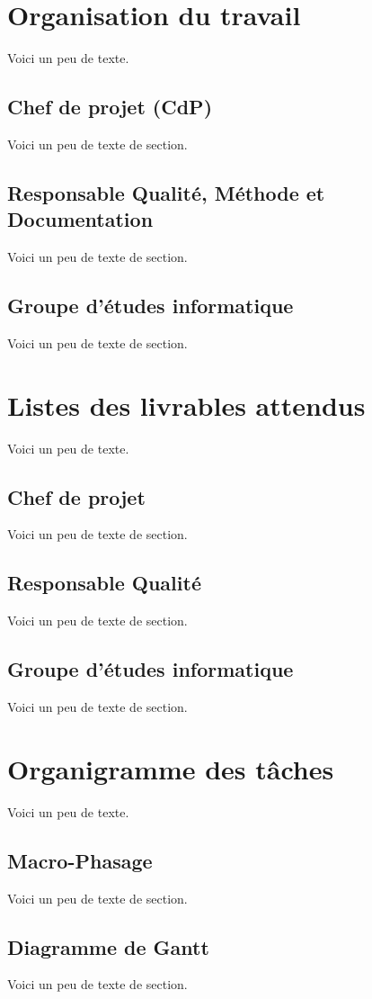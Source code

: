     \chapter{Organisation du travail}
    Voici un peu de texte.
    \section{Chef de projet (CdP)}
    Voici un peu de texte de section.
    \section{Responsable Qualité, Méthode et Documentation}
    Voici un peu de texte de section.
    \section{Groupe d'études informatique}
    Voici un peu de texte de section.
    
    \chapter{Listes des livrables attendus}
    Voici un peu de texte.
    \section{Chef de projet}
    Voici un peu de texte de section.
    \section{Responsable Qualité}
    Voici un peu de texte de section.
    \section{Groupe d'études informatique}
    Voici un peu de texte de section.
    
    \chapter{Organigramme des tâches}
    Voici un peu de texte.
    \section{Macro-Phasage}
    Voici un peu de texte de section.
    \section{Diagramme de Gantt}
    Voici un peu de texte de section.
    
